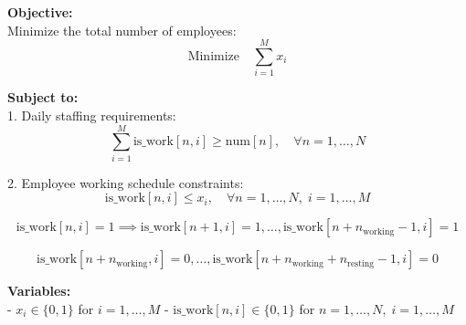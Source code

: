 \documentclass{article}
\begin{document}
\textbf{Objective:} \\
Minimize the total number of employees: 
\[
\text{Minimize} \quad \sum_{i=1}^{M} x_i
\]

\textbf{Subject to:} \\
1. Daily staffing requirements:
\[
\sum_{i=1}^{M} \text{is\_work}[n, i] \geq \text{num}[n], \quad \forall n = 1, \ldots, N
\]

2. Employee working schedule constraints:
\[
\text{is\_work}[n, i] \leq x_i, \quad \forall n = 1, \ldots, N, \; i = 1, \ldots, M
\]

\[
\text{is\_work}[n, i] = 1 \implies \text{is\_work}[n+1, i] = 1, \ldots, \text{is\_work}[n+n_{\text{working}}-1, i] = 1
\]

\[
\text{is\_work}[n+n_{\text{working}}, i] = 0, \ldots, \text{is\_work}[n+n_{\text{working}}+n_{\text{resting}}-1, i] = 0
\]

\textbf{Variables:} \\
- \( x_i \in \{0, 1\} \) for \( i = 1, \ldots, M \)
- \( \text{is\_work}[n, i] \in \{0, 1\} \) for \( n = 1, \ldots, N, \; i = 1, \ldots, M \)
\end{document}
